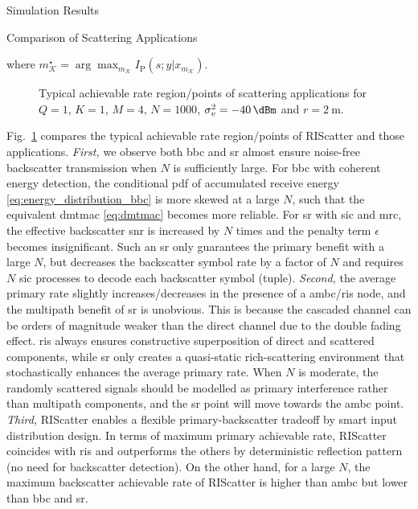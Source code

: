 \documentclass[journal]{IEEEtran}
\begin{document}
\begin{section}{Simulation Results}
\begin{subsection}{Comparison of Scattering Applications}
\begin{itemize}
\begin{equation}
			\end{equation}
			where $m_{\mathcal{K}}^{\star} = \arg \max_{m_{\mathcal{K}}} I_{\text{P}}(s;y|x_{m_{\mathcal{K}}})$.
		\end{itemize}
		\begin{figure}[!t]
			\centering
			\resizebox{0.65\columnwidth}{!}{
				
			}
			\caption{Typical achievable rate region/points of scattering applications for $Q=1$, $K=1$, $M=4$, $N=1000$, $\sigma_v^2=\qty{-40}{\dBm}$ and $r=\qty{2}{\meter}$.}
			\label{fg:region_comparison}
		\end{figure}

		Fig.~\ref{fg:region_comparison} compares the typical achievable rate region/points of RIScatter and those applications.
		\emph{First,} we observe both \gls{bbc} and \gls{sr} almost ensure noise-free backscatter transmission when $N$ is sufficiently large.
		For \gls{bbc} with coherent energy detection, the conditional \gls{pdf} of accumulated receive energy \eqref{eq:energy_distribution_bbc} is more skewed at a large $N$, such that the equivalent \gls{dmtmac} \eqref{eq:dmtmac} becomes more reliable.
		For \gls{sr} with \gls{sic} and \gls{mrc}, the effective backscatter \gls{snr} is increased by $N$ times and the penalty term $\epsilon$ becomes insignificant.
		Such an \gls{sr} only guarantees the primary benefit with a large $N$, but decreases the backscatter symbol rate by a factor of $N$ and requires $N$ \gls{sic} processes to decode each backscatter symbol (tuple).
		\emph{Second,} the average primary rate slightly increases/decreases in the presence of a \gls{ambc}/\gls{ris} node, and the multipath benefit of \gls{sr} is unobvious.
		This is because the cascaded channel can be orders of magnitude weaker than the direct channel due to the double fading effect.
		\gls{ris} always ensures constructive superposition of direct and scattered components, while \gls{sr} only creates a quasi-static rich-scattering environment that stochastically enhances the average primary rate.
		When $N$ is moderate, the randomly scattered signals should be modelled as primary interference rather than multipath components, and the \gls{sr} point will move towards the \gls{ambc} point.
		\emph{Third,} RIScatter enables a flexible primary-backscatter tradeoff by smart input distribution design.
		In terms of maximum primary achievable rate, RIScatter coincides with \gls{ris} and outperforms the others by deterministic reflection pattern (no need for backscatter detection).
		On the other hand, for a large $N$, the maximum backscatter achievable rate of RIScatter is higher than \gls{ambc} but lower than \gls{bbc} and \gls{sr}.

\end{subsection}
\end{section}
\end{document}
